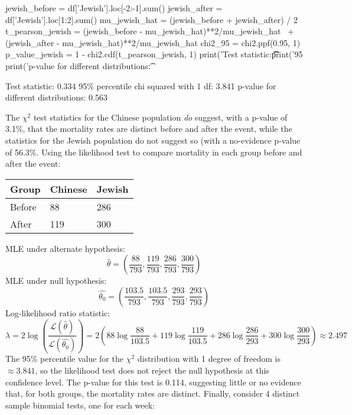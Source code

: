 \begin{python}
jewish_before = df['Jewish'].loc[-2:-1].sum()
jewish_after = df['Jewish'].loc[1:2].sum()
mu_jewish_hat = (jewish_before + jewish_after) / 2
t_pearson_jewish = (jewish_before - mu_jewish_hat)**2/mu_jewish_hat \
    + (jewish_after - mu_jewish_hat)**2/mu_jewish_hat
chi2_95 = chi2.ppf(0.95, 1)
p_value_jewish = 1 - chi2.cdf(t_pearson_jewish, 1)
print('Test statistic:\t\t\t\t%
print('95%
print('p-value for different distributions:\t%
\end{python}
\begin{console}
Test statistic:                         0.334
95\% percentile chi squared with 1 df:   3.841
p-value for different distributions:    0.563
\end{console}
The \(\chi^{2}\) test statistics for the Chinese population \emph{do}
suggest, with a p-value of 3.1\%, that the mortality rates are distinct
before and after the event, while the statistics for the Jewish
population do not suggest so (with a no-evidence p-value of 56.3\%.
Using the likelihood test to compare mortality in each group before and
after the event:
\begin{table}[H]
\centering
\begin{tabular}{@{}lll@{}}
\toprule
Group & Chinese & Jewish \\
\midrule
Before & 88 & 286 \\
After & 119 & 300 \\
\bottomrule
\end{tabular}
\end{table}
MLE under alternate hypothesis:
\[
\hat{\theta} = \left( \frac{88}{793}, \frac{119}{793}, \frac{286}{793}, \frac{300}{793} \right)
\]
MLE under null hypothesis:
\[
\hat{\theta_{0}} =\left( \frac{103.5}{793}, \frac{103.5}{793}, \frac{293}{793}, \frac{293}{793} \right)
\]
Log-likelihood ratio statistic:
\[
\lambda = 2 \log \left( \frac{\mathcal{L}(\hat{\theta})}{\mathcal{L}(\hat{\theta_{0}})} \right)
= 2 \left( 88 \log \frac{88}{103.5} + 119 \log \frac{119}{103.5} + 286 \log \frac{286}{293} + 300 \log \frac{300}{293} \right) \approx 2.497
\]
The 95\% percentile value for the \(\chi^{2}\) distribution with 1 degree
of freedom is \(\approx 3.841\), so the likelihood test does not reject
the null hypothesis at this confidence level. The p-value for this test
is 0.114, suggesting little or no evidence that, for both groups, the
mortality rates are distinct.
Finally, consider 4 distinct sample binomial tests, one for each week:


